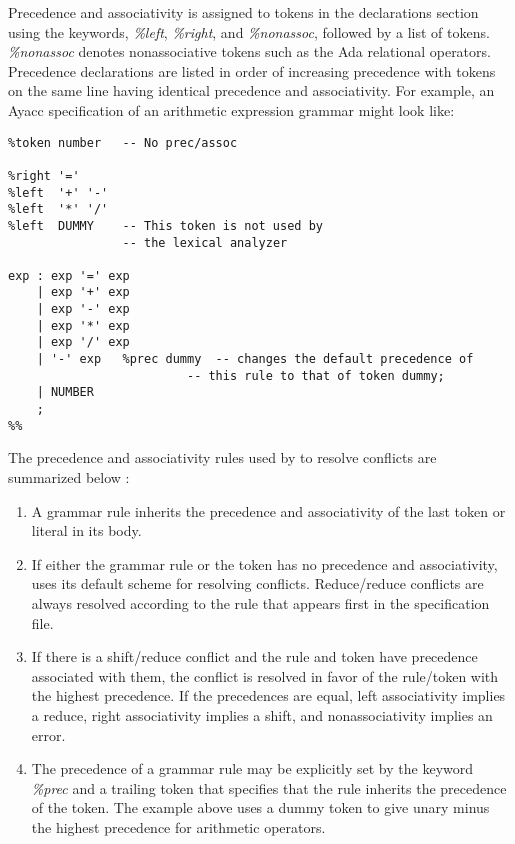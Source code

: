 Precedence and associativity is assigned to tokens in the
declarations section using the keywords,
{\it \%left},
{\it \%right},
and
{\it \%nonassoc},
followed by a list of tokens.
{\it \%nonassoc}
denotes nonassociative
tokens such as the Ada relational operators.  Precedence declarations
are listed in order of increasing precedence with tokens on the
same line having identical precedence and associativity.  For example,
an Ayacc specification of an
arithmetic expression  grammar might look like:
\newpage
\begin{verbatim}
%token number   -- No prec/assoc

%right '='
%left  '+' '-'
%left  '*' '/'
%left  DUMMY    -- This token is not used by
                -- the lexical analyzer

exp : exp '=' exp
    | exp '+' exp
    | exp '-' exp
    | exp '*' exp
    | exp '/' exp
    | '-' exp   %prec dummy  -- changes the default precedence of
                         -- this rule to that of token dummy;
    | NUMBER
    ;
%%

\end{verbatim}

The precedence and associativity rules used by \ayacc to resolve
conflicts are summarized below :

\begin{enumerate}
\item A grammar rule inherits the precedence and associativity of
the last token or literal in its body.
\item If either the grammar rule or the token has no precedence
and associativity, \ayacc uses its default scheme for
resolving conflicts.  Reduce/reduce conflicts are always resolved
according to the rule that appears first in the specification file.
\item If there is a shift/reduce conflict and the rule and token
have precedence associated with them, the conflict is
resolved in favor of the rule/token with the highest
precedence.  If the precedences are equal, left
associativity implies a reduce, right associativity implies
a shift, and nonassociativity implies an error.
\item The precedence of a grammar rule may be explicitly set by
the keyword
{\it \%prec}
and a trailing token that specifies
that the rule inherits the precedence of the token.  The
example above uses a dummy token to give unary minus
the highest precedence for arithmetic operators.
\end{enumerate}

